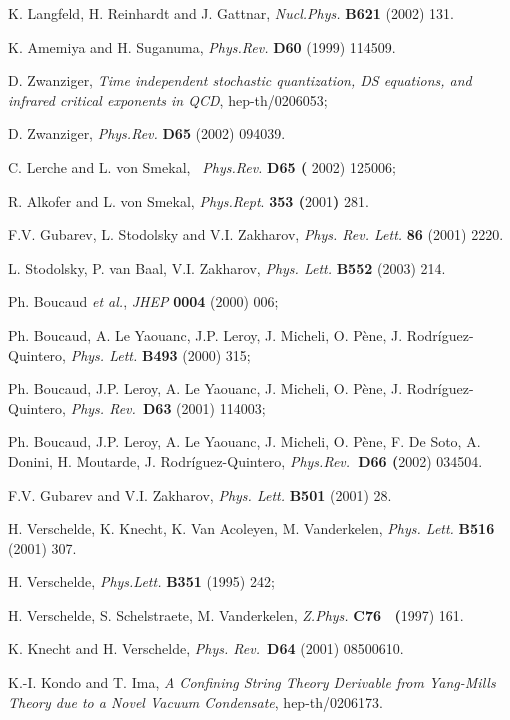 \documentclass[a4paper,12pt]{article}
\begin{document}
\begin{thebibliography}{99}
  K. Langfeld, H. Reinhardt and J. Gattnar, \emph{Nucl.Phys. }%
\textbf{B621 } (2002) 131.

  K. Amemiya and H. Suganuma, \emph{Phys.Rev.} \textbf{D60}
(1999) 114509.

  D. Zwanziger, \emph{Time independent stochastic quantization,
DS equations, and infrared critical exponents in QCD}, hep-th/0206053;

D. Zwanziger, \emph{Phys.Rev. }\textbf{D65} (2002) 094039.

  C. Lerche and L. von Smekal, \emph{\ Phys.Rev. }\textbf{D65 (}%
2002) 125006;

R. Alkofer and L. von Smekal, \emph{Phys.Rept}. \textbf{353 (}2001\textbf{) }%
281.

  F.V. Gubarev, L. Stodolsky and V.I. Zakharov, \emph{Phys. Rev.
Lett.} \textbf{86} (2001) 2220.

  L. Stodolsky, P. van Baal, V.I. Zakharov, \emph{Phys. Lett.} 
\textbf{B552} (2003) 214.

  Ph. Boucaud \textit{et al.}, \emph{JHEP} \textbf{0004 }(2000)
006;

Ph. Boucaud, A. Le Yaouanc, J.P. Leroy, J. Micheli, O. P\`{e}ne, J.
Rodr\'{i}guez-Quintero, \emph{Phys. Lett.} \textbf{B493} (2000) 315;

Ph. Boucaud, J.P. Leroy, A. Le Yaouanc, J. Micheli, O. P\`{e}ne, J.
Rodr\'{i}guez-Quintero, \emph{Phys. Rev.\ }\textbf{D63} (2001) 114003;

Ph. Boucaud, J.P. Leroy, A. Le Yaouanc, J. Micheli, O. P\`{e}ne, F. De Soto,
A. Donini, H. Moutarde, J. Rodr\'{i}guez-Quintero, \emph{Phys.Rev.}\textbf{\
D66 (}2002) 034504.

  F.V. Gubarev and V.I. Zakharov, \emph{Phys. Lett.} \textbf{%
B501 }(2001) 28.

  H. Verschelde, K. Knecht, K. Van Acoleyen, M. Vanderkelen, 
\emph{Phys. Lett.} \textbf{B516} (2001) 307.

  H. Verschelde, \emph{Phys.Lett. }\textbf{B351} (1995) 242;

H. Verschelde, S. Schelstraete, M. Vanderkelen, \emph{Z.Phys. }\textbf{C76 \
(}1997) 161.

  K. Knecht and H. Verschelde, \emph{Phys. Rev.\ }\textbf{D64}
(2001) 08500610.

  K.-I. Kondo and T. Ima, \emph{A Confining String Theory
Derivable from Yang-Mills Theory due to a Novel Vacuum Condensate},
hep-th/0206173.


\end{thebibliography}
\end{document}
